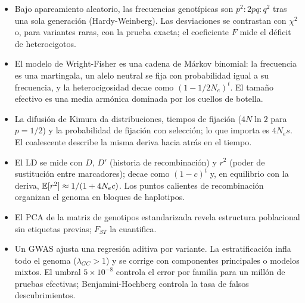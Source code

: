 \begin{resumen}
\begin{itemize}
  \item Bajo apareamiento aleatorio, las frecuencias genotípicas son $p^2:2pq:q^2$ tras una sola generación (Hardy-Weinberg). Las desviaciones se contrastan con $\chi^2$ o, para variantes raras, con la prueba exacta; el coeficiente $F$ mide el déficit de heterocigotos.
  \item El modelo de Wright-Fisher es una cadena de Márkov binomial: la frecuencia es una martingala, un alelo neutral se fija con probabilidad igual a su frecuencia, y la heterocigosidad decae como $(1-1/2N_e)^t$. El tamaño efectivo es una media armónica dominada por los cuellos de botella.
  \item La difusión de Kimura da distribuciones, tiempos de fijación ($4N\ln2$ para $p=1/2$) y la probabilidad de fijación con selección; lo que importa es $4N_es$. El coalescente describe la misma deriva hacia atrás en el tiempo.
  \item El LD se mide con $D$, $D'$ (historia de recombinación) y $r^2$ (poder de sustitución entre marcadores); decae como $(1-c)^t$ y, en equilibrio con la deriva, $\mathbb{E}[r^2]\approx1/(1+4N_ec)$. Los puntos calientes de recombinación organizan el genoma en bloques de haplotipos.
  \item El PCA de la matriz de genotipos estandarizada revela estructura poblacional sin etiquetas previas; $F_{ST}$ la cuantifica.
  \item Un GWAS ajusta una regresión aditiva por variante. La estratificación infla todo el genoma ($\lambda_{GC}>1$) y se corrige con componentes principales o modelos mixtos. El umbral $5\times10^{-8}$ controla el error por familia para un millón de pruebas efectivas; Benjamini-Hochberg controla la tasa de falsos descubrimientos.
\end{itemize}
\end{resumen}

